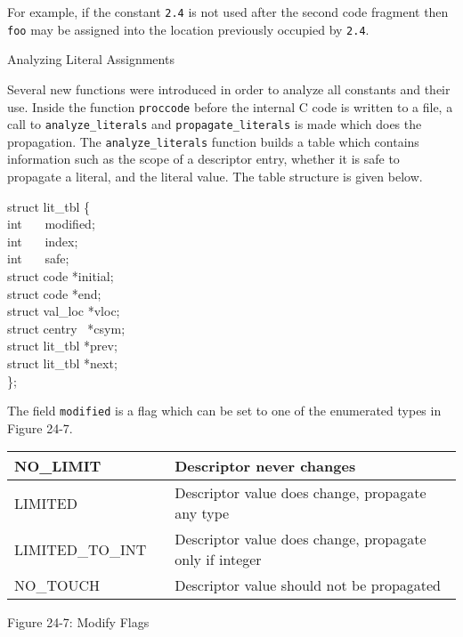 For example, if the constant \texttt{2.4} is not used after the second
code fragment then \texttt{{\textquotedbl}foo{\textquotedbl}} may be
assigned into the location previously occupied by \texttt{2.4}.

{\sffamily
Analyzing Literal Assignments}


Several new functions were introduced in order to analyze all
constants and their use. Inside the function \texttt{proccode} before
the internal C code is written to a file, a call to
\texttt{analyze\_literals} and \texttt{propagate\_literals} is made
which does the propagation. The \texttt{analyze\_literals} function
builds a table which contains information such as the scope of a
descriptor entry, whether it is safe to propagate a literal, and the
literal value. The table structure is given below.

\begin{iconcode}
struct lit\_tbl \{ \\
\> int \ \ \ modified; \\
\> int \ \ \ index; \\
\> int \ \ \ safe; \\
\> struct code *initial; \\
\> struct code *end; \\
\> struct val\_loc *vloc; \\
\> struct centry \ *csym; \\
\> struct lit\_tbl *prev; \\
\> struct lit\_tbl *next; \\
\};
\end{iconcode}

The field \texttt{modified} is a flag which can be set to one of the
enumerated types in Figure 24-7.

\begin{center}
\tabletail{}
\tablelasttail{}
\begin{xtabular}{|m{1.4302598in}|m{0.41155985in}|m{3.7115598in}|}
\hline
{\ttfamily NO\_LIMIT} &
 &
 Descriptor never changes\\\hline
{\ttfamily LIMITED} &
 &
 Descriptor value does change, propagate any type\\\hline
{\ttfamily LIMITED\_TO\_INT} &
 &
 Descriptor value does change, propagate only if integer\\\hline
{\ttfamily NO\_TOUCH} &
 &
 Descriptor value should not be propagated\\\hline
\end{xtabular}
\end{center}
{\centering{}
Figure 24-7: Modify Flags
\par}



